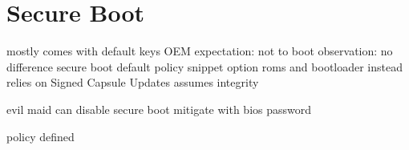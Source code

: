 
\section{Secure Boot}
mostly comes with default keys OEM
expectation:
not to boot
observation:
no difference
secure boot default policy snippet
option roms and bootloader
instead relies on Signed Capsule Updates
assumes integrity

\cite[32.3]{uefi-spec}

evil maid can disable secure boot
mitigate with bios password

policy defined
\cite[32.5.3.3 Authorization Process]{uefi-spec}

